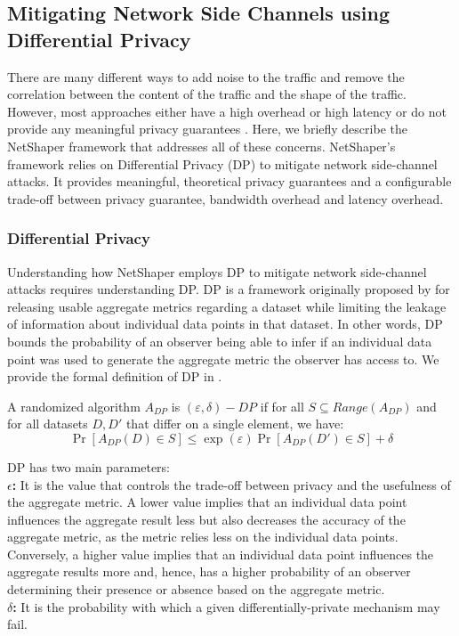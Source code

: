 \subsection{Mitigating Network Side Channels using Differential Privacy}
\label{subsec:netshaper-background-framework}

There are many different ways to add noise to the traffic and remove the correlation between the content of the traffic and the shape of the traffic.
However, most approaches either have a high overhead or high latency \cite{cai2014csbuflo, mehta2022pacer} or do not provide any meaningful privacy guarantees \cite{hou2020wf, nasr2021blind, rahman2020mockingbird, shan2021dolos, wang2017walkie, wright2009traffic}.
Here, we briefly describe the NetShaper framework that addresses all of these concerns.
NetShaper's framework relies on Differential Privacy (DP) to mitigate network side-channel attacks.
It provides meaningful, theoretical privacy guarantees and a configurable trade-off between privacy guarantee, bandwidth overhead and latency overhead.

\subsubsection{Differential Privacy}
\label{subsubsec:netshaper-background-framework-dp}
Understanding how NetShaper employs DP to mitigate network side-channel attacks requires understanding DP.
DP is a framework originally proposed by \citet{dwork2006differential} for releasing usable aggregate metrics regarding a dataset while limiting the leakage of information about individual data points in that dataset.
In other words, DP bounds the probability of an observer being able to infer if an individual data point was used to generate the aggregate metric the observer has access to.
We provide the formal definition of DP in . 

\begin{definition}
  \label{def:dp}
  A randomized algorithm $A_{DP}$ is $(\varepsilon, \delta)-DP$ if for all ${S} \subseteq Range(A_{DP})$ and for all datasets $D, D'$ that differ on a single element, we have:
  \begin{equation*}
    \Pr[A_{DP}(D) \in S] \leq \exp(\varepsilon)\Pr[A_{DP}(D') \in S] + \delta
  \end{equation*}
\end{definition}

DP has two main parameters: \\
\textbf{$\epsilon$: } It is the value that controls the trade-off between privacy and the usefulness of the aggregate metric.
A lower value implies that an individual data point influences the aggregate result less but also decreases the accuracy of the aggregate metric, as the metric relies less on the individual data points.
Conversely, a higher value implies that an individual data point influences the aggregate results more and, hence, has a higher probability of an observer determining their presence or absence based on the aggregate metric.\\
\textbf{$\delta$: } It is the probability with which a given differentially-private mechanism may fail.


